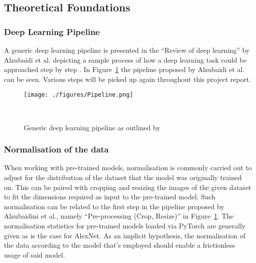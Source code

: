 \subsection{Theoretical Foundations}\label{foundations}


\subsubsection{Deep Learning Pipeline}
A generic deep learning pipeline is presented in the ``Review of deep learning'' by Alzubaidi et al\@. depicting a sample process of how a deep learning task could be approached step by step \citep{alzubaidi2021review}. In Figure~\ref{fig:pipeline} the pipeline proposed by Alzubaidi et al\@. can be seen. Various steps will be picked up again throughout this project report.
\begin{figure}[ht]
	\centering
	\texttt{[image: ./figures/Pipeline.png]}
	\caption{Generic deep learning pipeline as outlined by\citeauthor{alzubaidi2021review}}~\label{fig:pipeline}
\end{figure}

\subsubsection{Normalisation of the data}
When working with pre-trained models, normalisation is commonly carried out to adjust for the distribution of the dataset that the model was originally trained on. This can be paired with cropping and resizing the images of the given dataset to fit the dimensions required as input to the pre-trained model. Such normalisation can be related to the first step in the pipeline proposed by Alzubaidini et al., namely  ``Pre-processing (Crop, Resize)'' in Figure~\ref{fig:pipeline}. The normalisation statistics for pre-trained models loaded via PyTorch are generally given as is the case for AlexNet\citep{pytorchAlexNet}. As an implicit hypothesis, the normalisation of the data according to the model that's employed should enable a frictionless usage of said model.


